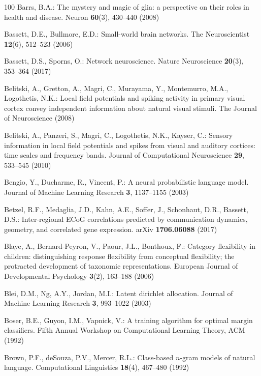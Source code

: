 \documentclass{llmxive}
\begin{document}
\begin{thebibliography}{100}
Barrs, B.A.: The mystery and magic of glia: a perspective on their roles in
  health and disease. Neuron  \textbf{60}(3),  430--440 (2008)

Bassett, D.E., Bullmore, E.D.: Small-world brain networks. The Neuroscientist
  \textbf{12}(6),  512--523 (2006)

Bassett, D.S., Sporns, O.: Network neuroscience. Nature Neuroscience
  \textbf{20}(3),  353--364 (2017)

Belitski, A., Gretton, A., Magri, C., Murayama, Y., Montemurro, M.A.,
  Logothetis, N.K.: Local field potentials and spiking activity in primary
  visual cortex convey independent information about natural visual stimuli.
  The Journal of Neuroscience  (2008)

Belitski, A., Panzeri, S., Magri, C., Logothetis, N.K., Kayser, C.: Sensory
  information in local field potentials and spikes from visual and auditory
  cortices: time scales and frequency bands. Journal of Computational
  Neuroscience  \textbf{29},  533--545 (2010)

Bengio, Y., Ducharme, R., Vincent, P.: A neural probabilistic language model.
  Journal of Machine Learning Research  \textbf{3},  1137--1155 (2003)

Betzel, R.F., Medaglia, J.D., Kahn, A.E., Soffer, J., Schonhaut, D.R., Bassett,
  D.S.: Inter-regional {ECoG} correlations predicted by communication dynamics,
  geometry, and correlated gene expression. {arXiv}  \textbf{1706.06088} (2017)

Blaye, A., Bernard-Peyron, V., Paour, J.L., Bonthoux, F.: Category flexibility
  in children: distinguishing response flexibility from conceptual flexibility;
  the protracted development of taxonomic representations. {European} Journal
  of Developmental Psychology  \textbf{3}(2),  163--188 (2006)

Blei, D.M., Ng, A.Y., Jordan, M.I.: Latent dirichlet allocation. Journal of
  Machine Learning Research  \textbf{3},  993--1022 (2003)

Boser, B.E., Guyon, I.M., Vapnick, V.: A training algorithm for optimal margin
  classifiers. Fifth Annual Workshop on Computational Learning Theory, {ACM}
  (1992)

Brown, P.F., {deSouza}, P.V., Mercer, R.L.: Class-based $n$-gram models of
  natural language. Computational Linguistics  \textbf{18}(4),  467--480 (1992)


\end{thebibliography}
\end{document}
